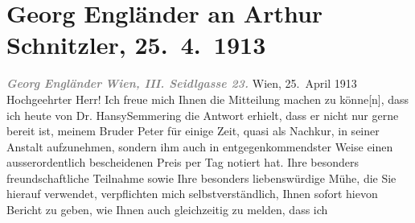 

         
         \renewcommand{\erwaehntePersonen}{Personen: Peter Altenberg, Georg Engländer, Margarethe Engländer, Franz Hansy}
         \renewcommand{\erwaehnteOrte}{Orte: Seidlgasse, Semmering, Wien}
         \renewcommand{\erwaehnteWerke}{}
               \section[Georg Engländer an Arthur Schnitzler, 25. 4. 1913]{ Georg Engländer an Arthur Schnitzler, 25. 4. 1913}\nopagebreak{}\rehead{ }\begin{ledgroupsized}[t]{13cm}\normalsize\beginnumbering{} \toendnotes[C]{\smallbreak\pagebreak[2]} 
\toendnotes[C]{\smallbreak}\pstart
           \noindent{}{\pb}\textcolor{gray}{\textbf{\textit{Georg Engländer}}}\pend
           \pstart
           \textcolor{gray}{\textbf{\textit{Wien, III. Seidlgasse 23.}}}\pend
           \pstart
           \raggedleft{}Wien, 25. April 1913\pend
           \pstart{}Hochgeehrter Herr!\pend\pstart
           Ich freue mich Ihnen die Mitteilung machen zu könne{[}n{]}, dass ich
               heute von Dr. HansySemmering die Antwort erhielt, dass er nicht nur
               gerne bereit ist, meinem Bruder Peter für
               einige Zeit, quasi als Nachkur, in seiner Anstalt aufzunehmen, sondern ihm auch in
               entgegenkommendster Weise einen ausserordentlich bescheidenen Preis per Tag notiert
               hat.\pend
           \pstart
           Ihre besonders freundschaftliche Teilnahme sowie Ihre besonders liebenswürdige Mühe,
               die Sie hierauf verwendet, verpflichten mich selbstverständlich, Ihnen sofort hievon
               Bericht zu geben, wie Ihnen auch gleichzeitig zu melden, dass ich

\end{ledgroupsized}

